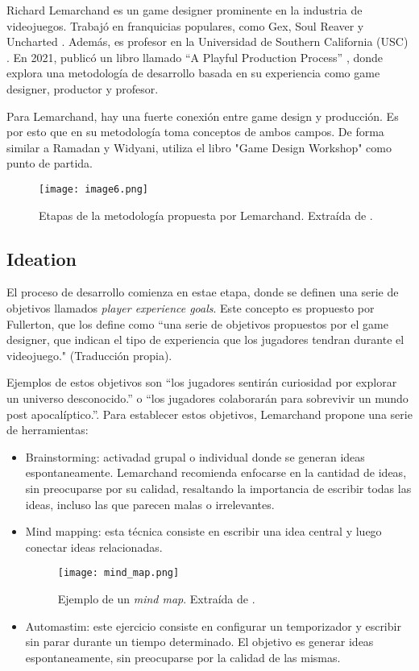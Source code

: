 %
%
\par Richard Lemarchand es un game designer prominente en la industria de videojuegos. Trabajó en franquicias populares, como Gex, Soul Reaver y Uncharted \cite{RichardLemarchandcom}. Además, es profesor en la Universidad de Southern California (USC) \cite{RichardLemarchandcom}. En 2021, publicó un libro llamado “A Playful Production Process” \cite{lemarchandPlayfulProductionProcess2021}, donde explora una metodología de desarrollo basada en su experiencia como game designer, productor y profesor.  
\par Para Lemarchand, hay una fuerte conexión entre game design y producción. Es por esto que en su metodología toma conceptos de ambos campos. De forma similar a Ramadan y Widyani, utiliza el libro "Game Design Workshop" \cite{fullertonGameDesignWorkshop2008} como punto de partida.
%
\begin{figure}[H]
  \centering
  \texttt{[image: image6.png]}
  \caption{Etapas de la metodología propuesta por Lemarchand. Extraída de \cite{lemarchandPlayfulProductionProcess2021}.}
  \label{fig:x proceso de desarrollo Lemarchand}
\end{figure}
%
%
%
\subsection{Ideation}
El proceso de desarrollo comienza en estae etapa, donde se definen una serie de objetivos llamados \textit{player experience goals}. Este concepto es propuesto por Fullerton, que los define como ``una serie de objetivos propuestos por el game designer, que indican el tipo de experiencia que los jugadores tendran durante el videojuego." \cite{fullertonGameDesignWorkshop2008} (Traducción propia).
\par Ejemplos de estos objetivos son ``los jugadores sentirán curiosidad por explorar un universo desconocido.'' o ``los jugadores colaborarán para sobrevivir un mundo post apocalíptico.''. Para establecer estos objetivos, Lemarchand propone una serie de herramientas:
\begin{itemize}
    \item Brainstorming: activadad grupal o individual donde se generan ideas espontaneamente. Lemarchand recomienda enfocarse en la cantidad de ideas, sin preocuparse por su calidad, resaltando la importancia de escribir todas las ideas, incluso las que parecen malas o irrelevantes.
    \item Mind mapping: esta técnica consiste en escribir una idea central y luego conectar ideas relacionadas. 
    \begin{figure}[H]
        \centering
        \texttt{[image: mind\_map.png]}
        \caption{Ejemplo de un \textit{mind map}. Extraída de \cite{lemarchandPlayfulProductionProcess2021}.}
        \label{fig:x ejemplo de un mind map Lemarchand}
    \end{figure} 
    \item Automastim: este ejercicio consiste en configurar un temporizador y escribir sin parar durante un tiempo determinado. El objetivo es generar ideas espontaneamente, sin preocuparse por la calidad de las mismas.
\end{itemize}
%
%
